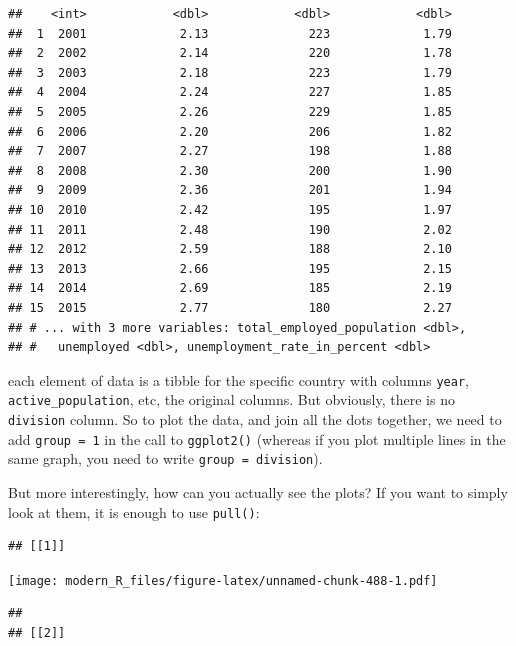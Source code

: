 \documentclass[]{gitbook}
\newenvironment{Shaded}{\begin{snugshade}}{\end{snugshade}}
\newcommand{\KeywordTok}[1]{\textcolor[rgb]{0.13,0.29,0.53}{\textbf{#1}}}
\newcommand{\NormalTok}[1]{#1}
\newcommand{\OperatorTok}[1]{\textcolor[rgb]{0.81,0.36,0.00}{\textbf{#1}}}
\newcommand{\StringTok}[1]{\textcolor[rgb]{0.31,0.60,0.02}{#1}}
\theoremstyle{definition}
\theoremstyle{definition}
\theoremstyle{definition}
\theoremstyle{remark}
\begin{document}
\begin{verbatim}
##    <int>            <dbl>            <dbl>            <dbl>
##  1  2001             2.13              223             1.79
##  2  2002             2.14              220             1.78
##  3  2003             2.18              223             1.79
##  4  2004             2.24              227             1.85
##  5  2005             2.26              229             1.85
##  6  2006             2.20              206             1.82
##  7  2007             2.27              198             1.88
##  8  2008             2.30              200             1.90
##  9  2009             2.36              201             1.94
## 10  2010             2.42              195             1.97
## 11  2011             2.48              190             2.02
## 12  2012             2.59              188             2.10
## 13  2013             2.66              195             2.15
## 14  2014             2.69              185             2.19
## 15  2015             2.77              180             2.27
## # ... with 3 more variables: total_employed_population <dbl>,
## #   unemployed <dbl>, unemployment_rate_in_percent <dbl>
\end{verbatim}

each element of data is a tibble for the specific country with columns
\texttt{year}, \texttt{active\_population}, etc, the original columns.
But obviously, there is no \texttt{division} column. So to plot the
data, and join all the dots together, we need to add
\texttt{group\ =\ 1} in the call to \texttt{ggplot2()} (whereas if you
plot multiple lines in the same graph, you need to write
\texttt{group\ =\ division}).

But more interestingly, how can you actually see the plots? If you want
to simply look at them, it is enough to use \texttt{pull()}:

\begin{Shaded}
\end{Shaded}

\begin{verbatim}
## [[1]]
\end{verbatim}

\texttt{[image: modern\_R\_files/figure-latex/unnamed-chunk-488-1.pdf]}

\begin{verbatim}
## 
## [[2]]
\end{verbatim}
\end{document}

